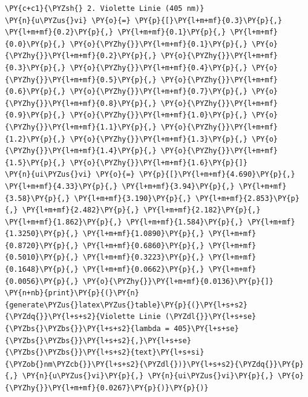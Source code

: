 \begin{tcolorbox}[breakable, size=fbox, boxrule=1pt, pad at break*=1mm,colback=cellbackground, colframe=cellborder]
\begin{Verbatim}[commandchars=\\\{\}]
\PY{c+c1}{\PYZsh{} 2. Violette Linie (405 nm)}
\PY{n}{u\PYZus{}vi} \PY{o}{=} \PY{p}{[}\PY{l+m+mf}{0.3}\PY{p}{,} \PY{l+m+mf}{0.2}\PY{p}{,} \PY{l+m+mf}{0.1}\PY{p}{,} \PY{l+m+mf}{0.0}\PY{p}{,} \PY{o}{\PYZhy{}}\PY{l+m+mf}{0.1}\PY{p}{,} \PY{o}{\PYZhy{}}\PY{l+m+mf}{0.2}\PY{p}{,} \PY{o}{\PYZhy{}}\PY{l+m+mf}{0.3}\PY{p}{,} \PY{o}{\PYZhy{}}\PY{l+m+mf}{0.4}\PY{p}{,} \PY{o}{\PYZhy{}}\PY{l+m+mf}{0.5}\PY{p}{,} \PY{o}{\PYZhy{}}\PY{l+m+mf}{0.6}\PY{p}{,} \PY{o}{\PYZhy{}}\PY{l+m+mf}{0.7}\PY{p}{,} \PY{o}{\PYZhy{}}\PY{l+m+mf}{0.8}\PY{p}{,} \PY{o}{\PYZhy{}}\PY{l+m+mf}{0.9}\PY{p}{,} \PY{o}{\PYZhy{}}\PY{l+m+mf}{1.0}\PY{p}{,} \PY{o}{\PYZhy{}}\PY{l+m+mf}{1.1}\PY{p}{,} \PY{o}{\PYZhy{}}\PY{l+m+mf}{1.2}\PY{p}{,} \PY{o}{\PYZhy{}}\PY{l+m+mf}{1.3}\PY{p}{,} \PY{o}{\PYZhy{}}\PY{l+m+mf}{1.4}\PY{p}{,} \PY{o}{\PYZhy{}}\PY{l+m+mf}{1.5}\PY{p}{,} \PY{o}{\PYZhy{}}\PY{l+m+mf}{1.6}\PY{p}{]}
\PY{n}{ui\PYZus{}vi} \PY{o}{=} \PY{p}{[}\PY{l+m+mf}{4.690}\PY{p}{,} \PY{l+m+mf}{4.33}\PY{p}{,} \PY{l+m+mf}{3.94}\PY{p}{,} \PY{l+m+mf}{3.58}\PY{p}{,} \PY{l+m+mf}{3.190}\PY{p}{,} \PY{l+m+mf}{2.853}\PY{p}{,} \PY{l+m+mf}{2.482}\PY{p}{,} \PY{l+m+mf}{2.182}\PY{p}{,} \PY{l+m+mf}{1.862}\PY{p}{,} \PY{l+m+mf}{1.584}\PY{p}{,} \PY{l+m+mf}{1.3250}\PY{p}{,} \PY{l+m+mf}{1.0890}\PY{p}{,} \PY{l+m+mf}{0.8720}\PY{p}{,} \PY{l+m+mf}{0.6860}\PY{p}{,} \PY{l+m+mf}{0.5010}\PY{p}{,} \PY{l+m+mf}{0.3223}\PY{p}{,} \PY{l+m+mf}{0.1648}\PY{p}{,} \PY{l+m+mf}{0.0662}\PY{p}{,} \PY{l+m+mf}{0.0056}\PY{p}{,} \PY{o}{\PYZhy{}}\PY{l+m+mf}{0.0136}\PY{p}{]}
\PY{n+nb}{print}\PY{p}{(}\PY{n}{generate\PYZus{}latex\PYZus{}table}\PY{p}{(}\PY{l+s+s2}{\PYZdq{}}\PY{l+s+s2}{Violette Linie (\PYZdl{}}\PY{l+s+se}{\PYZbs{}\PYZbs{}}\PY{l+s+s2}{lambda = 405}\PY{l+s+se}{\PYZbs{}\PYZbs{}}\PY{l+s+s2}{,}\PY{l+s+se}{\PYZbs{}\PYZbs{}}\PY{l+s+s2}{text}\PY{l+s+si}{\PYZob{}nm\PYZcb{}}\PY{l+s+s2}{\PYZdl{})}\PY{l+s+s2}{\PYZdq{}}\PY{p}{,} \PY{n}{u\PYZus{}vi}\PY{p}{,} \PY{n}{ui\PYZus{}vi}\PY{p}{,} \PY{o}{\PYZhy{}}\PY{l+m+mf}{0.0267}\PY{p}{)}\PY{p}{)}


\end{Verbatim}
\end{tcolorbox}
